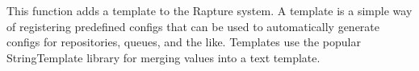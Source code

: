 This function adds a template to the Rapture system. A template is a simple way of registering predefined configs that can be used to automatically generate configs for repositories, queues, and the like.
Templates use the popular StringTemplate library for merging values into a text template.
